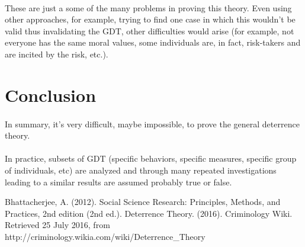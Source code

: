 \documentclass[11pt, a4paper]{article}
\begin{document}
\paragraph{}These are just a some of the many problems in proving this theory. Even using other approaches, for example, trying to find one case in which this wouldn’t be valid thus invalidating the GDT, other difficulties would arise (for example, not everyone has the same moral values, some individuals are, in fact, risk-takers and are incited by the risk, etc.).
\section{Conclusion}
\paragraph{}In summary, it’s very difficult, maybe impossible, to prove the general deterrence theory.
\paragraph{}In practice, subsets of GDT (specific behaviors, specific measures, specific group of individuals, etc) are analyzed and through many repeated investigations leading to a similar results are assumed probably true or false.  

\begin{thebibliography}{1}
Bhattacherjee, A. (2012). Social Science Research: Principles, Methods, and Practices, 2nd edition (2nd ed.).
Deterrence Theory. (2016). Criminology Wiki. Retrieved 25 July 2016, from http://criminology.wikia.com/wiki/Deterrence\_Theory
\end{thebibliography}
\end{document}

